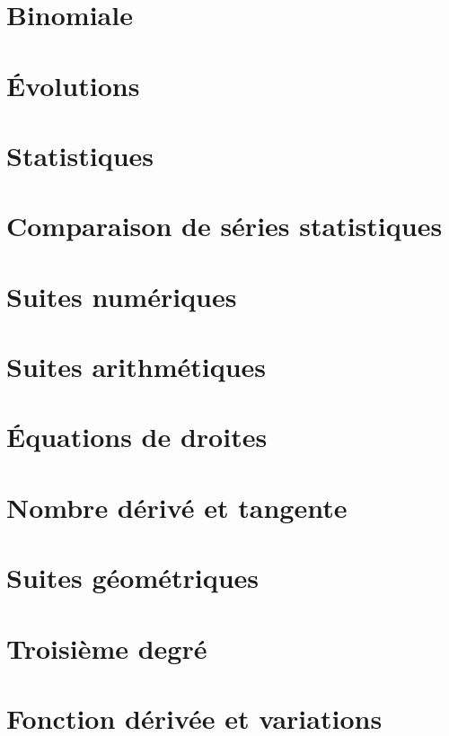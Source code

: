 \documentclass[a4paper,12pt]{book}
\begin{document}
\chapter{Binomiale}


\chapter{Évolutions}


\chapter{Statistiques}


\chapter{Comparaison de séries statistiques}


\chapter{Suites numériques}


\chapter{Suites arithmétiques}


\chapter{Équations de droites}


\chapter{Nombre dérivé et tangente}


\chapter{Suites géométriques}


\chapter{Troisième degré}


\chapter{Fonction dérivée et variations}

\end{document}
